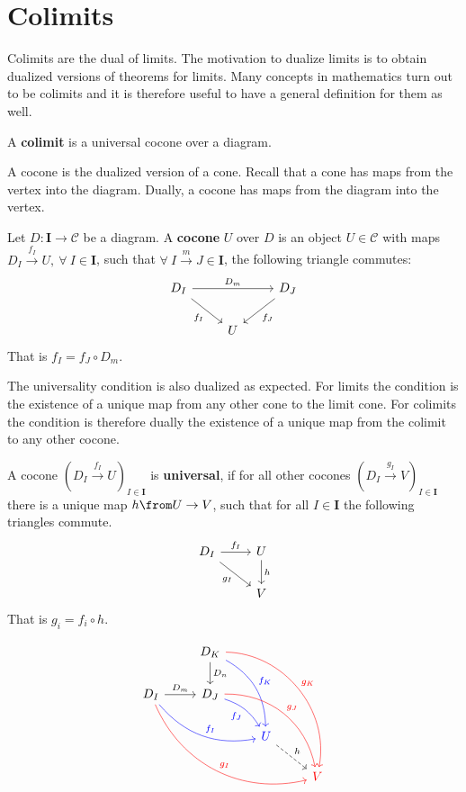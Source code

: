 \section{Colimits}
 Colimits are the dual of limits.
The motivation to dualize limits is to obtain dualized versions of theorems for limits.
Many concepts in mathematics turn out to be colimits and it is
therefore useful to have a general definition for them as well.
\begin{definition}
  A \textbf{colimit} is a universal cocone over a diagram.
\end{definition}
A cocone is the dualized version of a cone.
Recall that a cone has maps from the vertex into the diagram. Dually,
a cocone has maps from the diagram into the vertex.
\begin{definition}
  Let $D : \bm I \to \mathscr C$ be a diagram.
  A \textbf{cocone} $U$ over $D$ is an object $U \in \mathscr{C}$
  with maps $D_I \overset{ f_I}{\rightarrow} U,\ \forall\ I \in \bm{I}$, such that
  $\forall\ I \overset{m}{\to} J \in \bm{I}$, the following triangle commutes:
  \[
    \begin{tikzcd}
      D_I \arrow[rr, "D_m"]\arrow[dr, swap, "f_I"] & & D_J \arrow{dl}{f_J}\\
      & U  &
    \end{tikzcd}
  \]
  That is $f_I = f_J \circ D_m$.
\end{definition}
The universality condition is also dualized as expected.
For limits the condition is the existence of a unique map from
any other cone to the limit cone.
For colimits the condition is therefore dually the existence of a unique map
from the colimit to any other cocone.
\begin{definition}
  A cocone $(D_I\overset{f_I}{\to} U)_{I\in \bm{I}}$ is \textbf{universal}, if
  for all other cocones $(D_I \overset{g_I}{\to} V)_{I\in \bm{I}}$ there is a unique
  map $h \from U \to V$, such that for all $I \in \bm{I}$
  the following triangles commute.
  \[
    \begin{tikzcd}
      D_I \arrow[dr, swap, "g_I"] \arrow{r}{f_I} & U \arrow{d}{h} \\
      & V
    \end{tikzcd}
  \]
  That is $g_i = f_i \circ h$.
\end{definition}
\begin{example}
\[
    \begin{tikzcd}
      & D_K \arrow{d}{D_n}
      \arrow[bend left=30,color=blue]{ddr}{f_K}
      \arrow[bend left=50,color=red]{dddrr}{g_K} & & \\
      D_I \arrow{r}{D_m}
      \arrow[bend right=30,color=blue]{drr}{f_I}
      \arrow[bend right=40,color=red]{ddrrr}{g_I} &
      D_J \arrow[bend left=20,swap, color=blue]{dr}{f_J}
      \arrow[bend left=40,color=red]{ddrr}{g_J} & & \\
      & & {\color{blue}U} \arrow[dashed]{dr}{h}& \\
      & & & {\color{red}V}
    \end{tikzcd}
  \]
\end{example}

